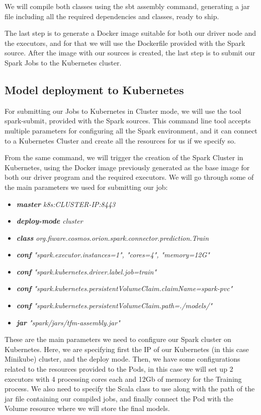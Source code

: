 We will compile both classes using the sbt assembly command, generating a jar file including all the required dependencies and classes, ready to ship. 

The last step is to generate a Docker image suitable for both our driver node and the executors, and for that we will use the Dockerfile provided with the Spark source. After the image with our sources is created, the last step is to submit our Spark Jobs to the Kubernetes cluster.

\subsection{Model deployment to Kubernetes}

For submitting our Jobs to Kubernetes in Cluster mode\cite{kubernetes-spark}, we will use the tool spark-submit, provided with the Spark sources. This command line tool accepts multiple parameters for configuring all the Spark environment, and it can connect to a Kubernetes Cluster and create all the resources for us if we specify so.

From the same command, we will trigger the creation of the Spark Cluster in Kubernetes, using the Docker image previously generated as the base image for both our driver program and the required executors. We will go through some of the main parameters we used for submitting our job:

\begin{itemize}
    \item \textit{\textbf{master} k8s:CLUSTER-IP:8443}
    \item \textit{\textbf{deploy-mode} cluster}
    \item \textit{\textbf{class} org.fiware.cosmos.orion.spark.connector.prediction.Train}
    \item \textit{\textbf{conf} "spark.executor.instances=1", "cores=4", "memory=12G"}
    \item \textit{\textbf{conf} "spark.kubernetes.driver.label.job=train"}
    \item \textit{\textbf{conf} "spark.kubernetes.persistentVolumeClaim.claimName=spark-pvc"}
    \item \textit{\textbf{conf} "spark.kubernetes.persistentVolumeClaim.path=./models/" }
    \item \textit{\textbf{jar} "spark/jars/tfm-assembly.jar"}
\end{itemize}

These are the main parameters we need to configure our Spark cluster on Kubernetes. Here, we are specifying first the IP of our Kubernetes (in this case Minikube) cluster, and the deploy mode. Then, we have some configurations related to the resources provided to the Pods, in this case we will set up 2 executors with 4 processing cores each and 12Gb of memory for the Training process. We also need to specify the Scala class to use along with the path of the jar file containing our compiled jobs, and finally connect the Pod with the Volume resource where we will store the final models.

